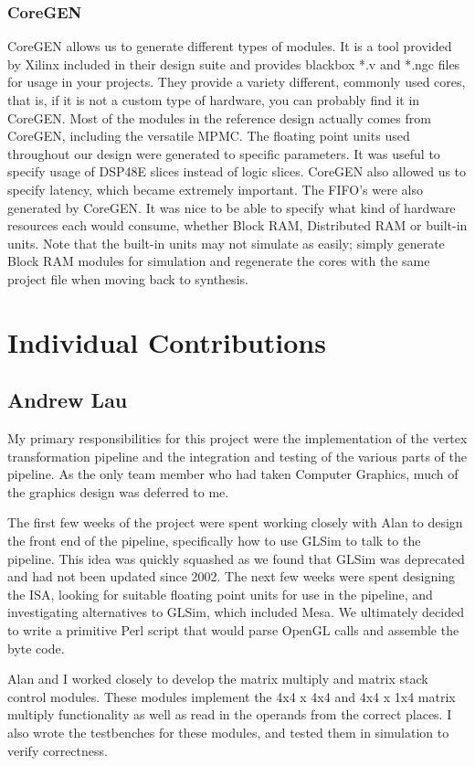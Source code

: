 \documentclass[letterpaper,10pt]{article}
\begin{document}
\subsubsection{CoreGEN}
CoreGEN allows us to generate different types of modules.  It is a tool provided by Xilinx included in their design suite and provides blackbox *.v and *.ngc files for usage in your projects.  They provide a variety different, commonly used cores, that is, if it is not a custom type of hardware, you can probably find it in CoreGEN.  Most of the modules in the reference design actually comes from CoreGEN, including the versatile MPMC.  The floating point units used throughout our design were generated to specific parameters.  It was useful to specify usage of DSP48E slices instead of logic slices.  CoreGEN also allowed us to specify latency, which became extremely important.  The FIFO's were also generated by CoreGEN.  It was nice to be able to specify what kind of hardware resources each would consume, whether Block RAM, Distributed RAM or built-in units.  Note that the built-in units may not simulate as easily; simply generate Block RAM modules for simulation and regenerate the cores with the same project file when moving back to synthesis.


\section{Individual Contributions}
\subsection{Andrew Lau}
My primary responsibilities for this project were the implementation of the vertex transformation pipeline and the integration and testing of the various parts of the pipeline. As the only team member who had taken Computer Graphics, much of the graphics design was deferred to me. 

The first few weeks of the project were spent working closely with Alan to design the front end of the pipeline, specifically how to use GLSim to talk to the pipeline. This idea was quickly squashed as we found that GLSim was deprecated and had not been updated since 2002. The next few weeks were spent designing the ISA, looking for suitable floating point units for use in the pipeline, and investigating alternatives to GLSim, which included Mesa. We ultimately decided to write a primitive Perl script that would parse OpenGL calls and assemble the byte code.

Alan and I worked closely to develop the matrix multiply and matrix stack control modules. These modules implement the 4x4 x 4x4 and 4x4 x 1x4 matrix multiply functionality as well as read in the operands from the correct places. I also wrote the testbenches for these modules, and tested them in simulation to verify correctness.
\end{document}
